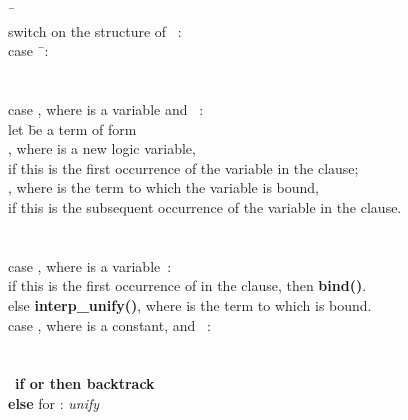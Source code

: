 \begin{figure}\footnotesize
\begin{tabbing}
\=\ {\boldmath }  \\
                  \> switch on the structure of \ : \\
                  \> case \=\ : \\
                  \>        \\
                  \>       \\
                  \> case \>, where  is a variable and \ : \\
                  \>      \> let \=  be a term of form   \\
                  \>      \>     \> , where  is a new logic variable, \\
                  \>      \>     \> if this is the first occurrence of the variable in the clause;\\
                  \>      \>     \> , where  is the term to which the variable  is bound, \\
                  \>      \>     \> if this is the subsequent occurrence of the variable in the clause. \\
                  \>       \\
                  \>       \\
                  \> case \>, where  is a variable\ : \\
                  \>      \>if this is the first occurrence of  in the clause, then {\bf bind({\boldmath })}. \\
                  \>      \>else {\bf interp\_unify({\boldmath })}, where  is the term to which  is bound. \\
                  \> case \>, where  is a constant, and \ : \\
                  \>       \\
                  \>       \\
                  \>      \ \={\bf if \boldmath  or \boldmath  then backtrack} \\
                  \>      \>            \> {\bf else } for : {\it unify}\ {\boldmath }  \\
                  \>        \> \\

\end{tabbing}
\end{figure}
